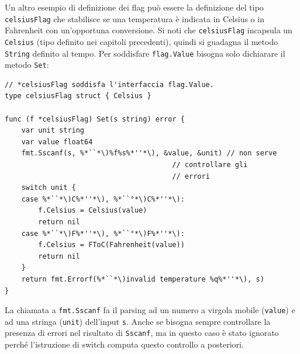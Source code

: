 Un altro esempio di definizione dei flag può essere la definizione del tipo \verb|celsiusFlag| che stabilisce se una temperatura è indicata in Celsius o in Fahrenheit con un'opportuna conversione.
Si noti che \verb|celsiusFlag| incapsula un \verb|Celsius| (tipo definito nei capitoli precedenti), quindi si guadagna il metodo \verb|String| definito al tempo.
Per soddisfare \verb|flag.Value| bisogna solo dichiarare il metodo \verb|Set|:
\begin{lstlisting}[frame=single, label={lst:lstlisting6-4.5}]
// *celsiusFlag soddisfa l'interfaccia flag.Value.
type celsiusFlag struct { Celsius }

func (f *celsiusFlag) Set(s string) error {
    var unit string
    var value float64
    fmt.Sscanf(s, %*``*\)%f%s%*''*\), &value, &unit) // non serve
                                        // controllare gli
                                        // errori
    switch unit {
    case %*``*\)C%*''*\), %*``°*\)C%*''*\):
        f.Celsius = Celsius(value)
        return nil
    case %*``*\)F%*''*\), %*``°*\)F%*''*\):
        f.Celsius = FToC(Fahrenheit(value))
        return nil
    }
    return fmt.Errorf(%*``*\)invalid temperature %q%*''*\), s)
}
\end{lstlisting}
La chiamata a \verb|fmt.Sscanf| fa il parsing ad un numero a virgola mobile (\verb|value|) e ad una stringa (\verb|unit|) dell'input \verb|s|.
Anche se bisogna sempre controllare la presenza di errori nel risultato di \verb|Sscanf|, ma in questo caso è stato ignorato perché l'istruzione di switch computa questo controllo a posteriori.

